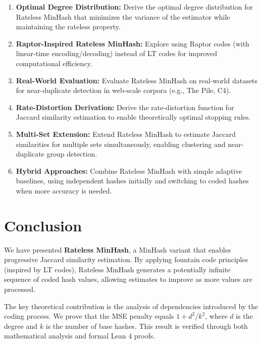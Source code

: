 \documentclass[11pt,letterpaper]{article}
\begin{document}
\begin{enumerate}
    \item \textbf{Optimal Degree Distribution:} Derive the optimal degree distribution for Rateless MinHash that minimizes the variance of the estimator while maintaining the rateless property.
    
    \item \textbf{Raptor-Inspired Rateless MinHash:} Explore using Raptor codes (with linear-time encoding/decoding) instead of LT codes for improved computational efficiency.
    
    \item \textbf{Real-World Evaluation:} Evaluate Rateless MinHash on real-world datasets for near-duplicate detection in web-scale corpora (e.g., The Pile, C4).
    
    \item \textbf{Rate-Distortion Derivation:} Derive the rate-distortion function for Jaccard similarity estimation to enable theoretically optimal stopping rules.
    
    \item \textbf{Multi-Set Extension:} Extend Rateless MinHash to estimate Jaccard similarities for multiple sets simultaneously, enabling clustering and near-duplicate group detection.
    
    \item \textbf{Hybrid Approaches:} Combine Rateless MinHash with simple adaptive baselines, using independent hashes initially and switching to coded hashes when more accuracy is needed.
\end{enumerate}

\section{Conclusion}

We have presented \textbf{Rateless MinHash}, a MinHash variant that enables progressive Jaccard similarity estimation. By applying fountain code principles (inspired by LT codes), Rateless MinHash generates a potentially infinite sequence of coded hash values, allowing estimates to improve as more values are processed.

The key theoretical contribution is the analysis of dependencies introduced by the coding process. We prove that the MSE penalty equals $1 + d^2/k^2$, where $d$ is the degree and $k$ is the number of base hashes. This result is verified through both mathematical analysis and formal Lean 4 proofs.
\end{document}
